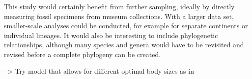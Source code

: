 This study would certainly benefit from further sampling, ideally by directly measuring fossil specimens from museum collections.
With a larger data set, smaller-scale analyses could be conducted, for example for separate continents or individual lineages.
It would also be interesting to include phylogenetic relationships, although many species and genera would have to be revisited and revised before a complete phylogeny can be created.


--> Try model that allows for different optimal body sizes as in \cite{Jaffe2011a}
















